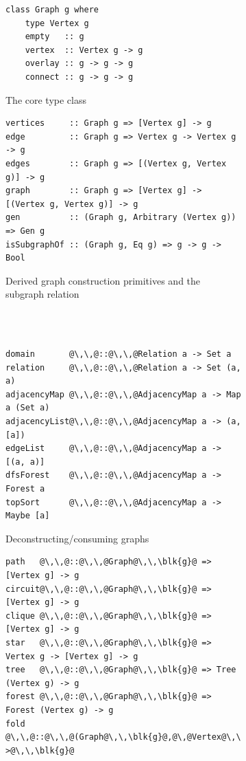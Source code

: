 \begin{figure}
\begin{subfigure}[b]{0.27\linewidth}
\begin{verbatim}
class Graph g where
    type Vertex g
    empty   :: g
    vertex  :: Vertex g -> g
    overlay :: g -> g -> g
    connect :: g -> g -> g
\end{verbatim}
\caption{The core type class}
\end{subfigure}
\hfill
\hfill
\vrule
\hfill
\hfill
\begin{subfigure}[b]{0.68\linewidth}
\begin{verbatim}
vertices     :: Graph g => [Vertex g] -> g
edge         :: Graph g => Vertex g -> Vertex g -> g
edges        :: Graph g => [(Vertex g, Vertex g)] -> g
graph        :: Graph g => [Vertex g] -> [(Vertex g, Vertex g)] -> g
gen          :: (Graph g, Arbitrary (Vertex g)) => Gen g
isSubgraphOf :: (Graph g, Eq g) => g -> g -> Bool
\end{verbatim}
\caption{Derived graph construction primitives and the subgraph relation}
\end{subfigure}
~\\
~\\
\begin{subfigure}[b]{0.49\linewidth}
\begin{verbatim}
domain       @\,\,@::@\,\,@Relation a -> Set a
relation     @\,\,@::@\,\,@Relation a -> Set (a, a)
adjacencyMap @\,\,@::@\,\,@AdjacencyMap a -> Map a (Set a)
adjacencyList@\,\,@::@\,\,@AdjacencyMap a -> (a, [a])
edgeList     @\,\,@::@\,\,@AdjacencyMap a -> [(a, a)]
dfsForest    @\,\,@::@\,\,@AdjacencyMap a -> Forest a
topSort      @\,\,@::@\,\,@AdjacencyMap a -> Maybe [a]
\end{verbatim}
\caption{Deconstructing/consuming graphs}
\end{subfigure}
\hfill
\hfill
\vrule
\hfill
\hfill
\begin{subfigure}[b]{0.47\linewidth}
\begin{verbatim}
path   @\,\,@::@\,\,@Graph@\,\,\blk{g}@ => [Vertex g] -> g
circuit@\,\,@::@\,\,@Graph@\,\,\blk{g}@ => [Vertex g] -> g
clique @\,\,@::@\,\,@Graph@\,\,\blk{g}@ => [Vertex g] -> g
star   @\,\,@::@\,\,@Graph@\,\,\blk{g}@ => Vertex g -> [Vertex g] -> g
tree   @\,\,@::@\,\,@Graph@\,\,\blk{g}@ => Tree (Vertex g) -> g
forest @\,\,@::@\,\,@Graph@\,\,\blk{g}@ => Forest (Vertex g) -> g
fold   @\,\,@::@\,\,@(Graph@\,\,\blk{g}@,@\,@Vertex@\,\,\blk{g}\,\teq@@\,\blk{a}@)@\,\,@=>@\,\,@Expr@\,\,\blk{a}\,\,@->@\,\,\blk{g}@

\end{verbatim}
\end{subfigure}
\end{figure}
